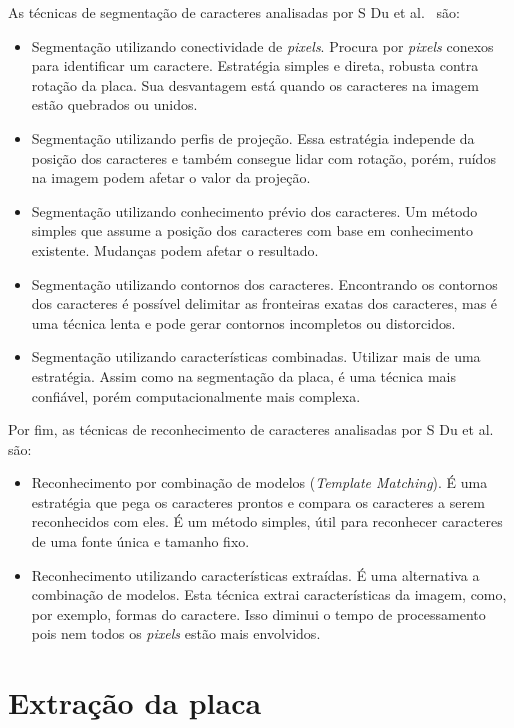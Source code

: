 As técnicas de segmentação de caracteres analisadas por S Du et al.~\cite{s2013automatic} são:

\begin{itemize}
	\item Segmentação utilizando conectividade de \emph{pixels}. Procura por \emph{pixels} conexos para identificar um caractere. Estratégia simples e direta, robusta contra rotação da placa. Sua desvantagem está quando os caracteres na imagem estão quebrados ou unidos.
    \item Segmentação utilizando perfis de projeção. Essa estratégia independe da posição dos caracteres e também consegue lidar com rotação, porém, ruídos na imagem podem afetar o valor da projeção.
    \item Segmentação utilizando conhecimento prévio dos caracteres. Um método simples que assume a posição dos caracteres com base em conhecimento existente. Mudanças podem afetar o resultado.
    \item Segmentação utilizando contornos dos caracteres. Encontrando os contornos dos caracteres é possível delimitar as fronteiras exatas dos caracteres, mas é uma técnica lenta e pode gerar contornos incompletos ou distorcidos.
    \item Segmentação utilizando características combinadas. Utilizar mais de uma estratégia. Assim como na segmentação da placa, é uma técnica mais confiável, porém computacionalmente mais complexa.    
\end{itemize}

Por fim, as técnicas de reconhecimento de caracteres analisadas por S Du et al.~\cite{s2013automatic} são:

\begin{itemize}
	\item Reconhecimento por combinação de modelos (\emph{Template Matching}). É uma estratégia que pega os caracteres prontos e compara os caracteres a serem reconhecidos com eles. É um método simples, útil para reconhecer caracteres de uma fonte única e tamanho fixo.
    \item Reconhecimento utilizando características extraídas. É uma alternativa a combinação de modelos. Esta técnica extrai características da imagem, como, por exemplo, formas do caractere. Isso diminui o tempo de processamento pois nem todos os \emph{pixels} estão mais envolvidos. 
\end{itemize}

\section{Extração da placa}

